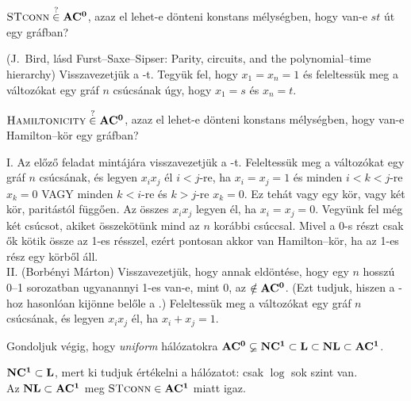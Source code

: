 \begin{Exercise}[counter={sorszam}, difficulty=0]
	$\mbox{\sc{STconn}} \stackrel ?\in \mbox{\ensuremath{\mathbf{AC^0}}}$, azaz el lehet-e d\"onteni konstans m\'elys\'egben, hogy van-e $st$ \'ut egy gr\'afban?
\end{Exercise}
\begin{Answer}
	(J.~Bird, l\'asd Furst--Saxe--Sipser: Parity, circuits, and the polynomial--time hierarchy) Visszavezetj\"uk a -t. Tegy\"uk fel, hogy $x_1=x_n=1$ \'es feleltess\"uk meg a v\'altoz\'okat egy gr\'af $n$ cs\'ucs\'anak \'ugy, hogy $x_1=s$ \'es $x_n=t$.
\end{Answer}

\begin{Exercise}[counter={sorszam}, difficulty=0]
	$\mbox{\sc{Hamiltonicity}} \stackrel ?\in \mbox{\ensuremath{\mathbf{AC^0}}}$, azaz el lehet-e d\"onteni konstans m\'elys\'egben, hogy van-e Hamilton--k\"or egy gr\'afban?
\end{Exercise}
\begin{Answer}
	I. Az el\H oz\H o feladat mint\'aj\'ara visszavezetj\"uk a -t. Feleltess\"uk meg a v\'altoz\'okat egy gr\'af $n$ cs\'ucs\'anak, \'es legyen $x_ix_j$ \'el $i<j$-re, ha $x_i=x_j=1$ \'es minden $i<k<j$-re $x_k=0$ VAGY minden $k<i$-re \'es $k>j$-re $x_k=0$. Ez teh\'at vagy egy k\"or, vagy k\'et k\"or, parit\'ast\'ol f\"ugg\H oen. Az \"osszes $x_ix_j$ legyen \'el, ha $x_i=x_j=0$. Vegy\"unk fel m\'eg k\'et cs\'ucsot, akiket \"osszek\"ot\"unk mind az $n$ kor\'abbi cs\'uccsal. Mivel a 0-s r\'eszt csak \H ok k\"otik \"ossze az 1-es r\'esszel, ez\'ert pontosan akkor van Hamilton--k\"or, ha az 1-es r\'esz egy k\"orb\H ol \'all.\\
	II. (Borb\'enyi M\'arton) Visszavezetj\"uk, hogy annak eld\"ont\'ese, hogy egy $n$ hossz\'u 0--1 sorozatban ugyanannyi 1-es van-e, mint 0, az $\notin \mbox{\ensuremath{\mathbf{AC^0}}}$.
	(Ezt tudjuk, hiszen a -hoz hasonl\'oan kij\"onne bel\H ole a .)
	Feleltess\"uk meg a v\'altoz\'okat egy gr\'af $n$ cs\'ucs\'anak, \'es legyen $x_ix_j$ \'el, ha $x_i+x_j=1$.
\end{Answer}


\begin{Exercise}[counter={sorszam}, difficulty=0]
	Gondoljuk v\'egig, hogy \emph{uniform} h\'al\'ozatokra $\mbox{\ensuremath{\mathbf{AC^0}}}\varsubsetneq\mbox{\ensuremath{\mathbf{NC^1}}}\subset\mbox{\ensuremath{\mathbf{L}}}\subset\mbox{\ensuremath{\mathbf{NL}}}\subset\mbox{\ensuremath{\mathbf{AC^1}}}$.
\end{Exercise}
\begin{Answer}
	$\mbox{\ensuremath{\mathbf{NC^1}}}\subset\mbox{\ensuremath{\mathbf{L}}}$, mert ki tudjuk \'ert\'ekelni a h\'al\'ozatot: csak $\log$ sok szint van.\\
	Az $\mbox{\ensuremath{\mathbf{NL}}}\subset\mbox{\ensuremath{\mathbf{AC^1}}}$ meg $\mbox{\sc{STconn}}\in \mbox{\ensuremath{\mathbf{AC^1}}}$ miatt igaz.
\end{Answer}





